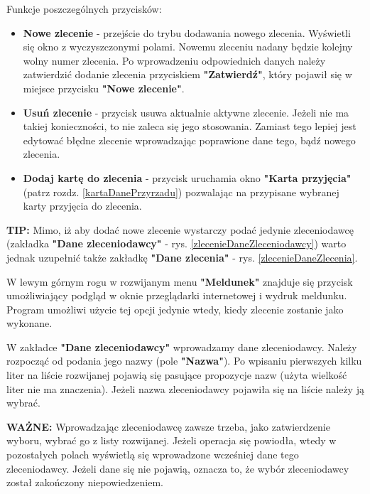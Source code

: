 Funkcje poszczególnych przycisków:
\begin{itemize}
	\item \textbf{Nowe zlecenie} - przejście do trybu dodawania nowego zlecenia. Wyświetli się okno z wyczyszczonymi polami. Nowemu zleceniu nadany będzie kolejny wolny numer zlecenia. Po wprowadzeniu odpowiednich danych należy zatwierdzić dodanie zlecenia przyciskiem \textbf{"Zatwierdź"}, który pojawił się w miejsce przycisku \textbf{"Nowe zlecenie"}. 
	\item \textbf{Usuń zlecenie} - przycisk usuwa aktualnie aktywne zlecenie. Jeżeli nie ma takiej konieczności, to nie zaleca się jego stosowania. Zamiast tego lepiej jest edytować błędne zlecenie wprowadzając poprawione dane tego, bądź nowego zlecenia.
	\item \textbf{Dodaj kartę do zlecenia} - przycisk uruchamia okno \textbf{"Karta przyjęcia"} (patrz rozdz. \ref{kartaDanePrzyrzadu}) pozwalając na przypisane wybranej karty przyjęcia do zlecenia.
\end{itemize}

	\textbf{TIP:} Mimo, iż aby dodać nowe zlecenie wystarczy podać jedynie zleceniodawcę (zakładka \textbf{"Dane zleceniodawcy"} - rys. \ref{zlecenieDaneZleceniodawcy}) warto jednak uzupełnić także zakładkę \textbf{"Dane zlecenia"} - rys. \ref{zlecenieDaneZlecenia}.

W lewym górnym rogu w rozwijanym menu \textbf{"Meldunek"} znajduje się przycisk umożliwiający podgląd w oknie przeglądarki internetowej i wydruk meldunku. Program umożliwi użycie tej opcji jedynie wtedy, kiedy zlecenie zostanie jako wykonane.

W zakładce \textbf{"Dane zleceniodawcy"} wprowadzamy dane zleceniodawcy. Należy rozpocząć od podania jego nazwy (pole \textbf{"Nazwa"}). Po wpisaniu pierwszych kilku liter na liście rozwijanej pojawią się pasujące propozycje nazw (użyta wielkość liter nie ma znaczenia). Jeżeli nazwa zleceniodawcy pojawiła się na liście należy ją wybrać. 

\textbf{WAŻNE:} Wprowadzając zleceniodawcę zawsze trzeba, jako zatwierdzenie wyboru, wybrać go z listy rozwijanej. Jeżeli operacja się powiodła, wtedy w pozostałych polach wyświetlą się wprowadzone wcześniej dane tego zleceniodawcy. Jeżeli dane się nie pojawią, oznacza to, że wybór zleceniodawcy został zakończony niepowiedzeniem.


